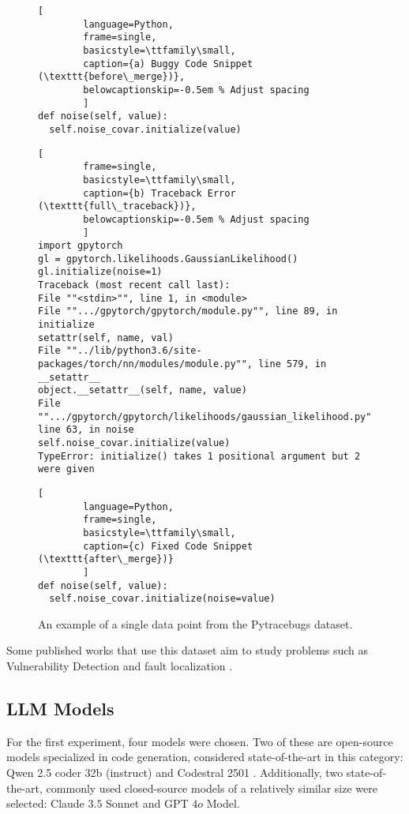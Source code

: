 \begin{figure}[h!]
    \centering
    \caption{An example of a single data point from the Pytracebugs dataset.}
    \label{fig:dataset-example}

    \begin{lstlisting}[
        language=Python,
        frame=single,
        basicstyle=\ttfamily\small,
        caption={a) Buggy Code Snippet (\texttt{before\_merge})},
        belowcaptionskip=-0.5em % Adjust spacing
        ]
def noise(self, value):
  self.noise_covar.initialize(value)
    \end{lstlisting}

    \begin{lstlisting}[
        frame=single,
        basicstyle=\ttfamily\small,
        caption={b) Traceback Error (\texttt{full\_traceback})},
        belowcaptionskip=-0.5em % Adjust spacing
        ]
import gpytorch
gl = gpytorch.likelihoods.GaussianLikelihood()
gl.initialize(noise=1)
Traceback (most recent call last):
File ""<stdin>"", line 1, in <module>
File "".../gpytorch/gpytorch/module.py"", line 89, in initialize
setattr(self, name, val)
File ""../lib/python3.6/site-packages/torch/nn/modules/module.py"", line 579, in __setattr__
object.__setattr__(self, name, value)
File "".../gpytorch/gpytorch/likelihoods/gaussian_likelihood.py"", line 63, in noise
self.noise_covar.initialize(value)
TypeError: initialize() takes 1 positional argument but 2 were given
    \end{lstlisting}

    \begin{lstlisting}[
        language=Python,
        frame=single,
        basicstyle=\ttfamily\small,
        caption={c) Fixed Code Snippet (\texttt{after\_merge})}
        ]
def noise(self, value):
  self.noise_covar.initialize(noise=value)
    \end{lstlisting}
\end{figure}


Some published works that use this dataset aim to study problems such as Vulnerability Detection \cite{zhao2024coding} and fault localization \cite{kulkarni2024graph}.

\subsection{LLM Models}
For the first experiment, four models were chosen. Two of these are open-source models specialized in code generation, considered state-of-the-art in this category: Qwen 2.5 coder 32b (instruct) \cite{hui2024qwen25codertechnicalreport} and Codestral 2501 \cite{Codestral_202501}. Additionally, two state-of-the-art, commonly used closed-source models of a relatively similar size were selected: Claude $3.5$ Sonnet and GPT $4o$ Model.

